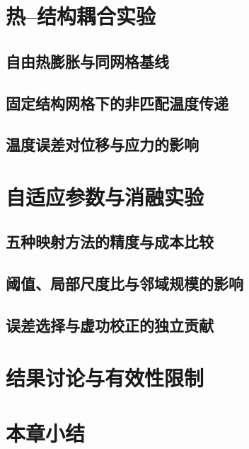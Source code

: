 \section{热--结构耦合实验}
\subsection{自由热膨胀与同网格基线}
\thesisdraftnote

\subsection{固定结构网格下的非匹配温度传递}
\thesisdraftnote

\subsection{温度误差对位移与应力的影响}
\thesisdraftnote

\section{自适应参数与消融实验}
\subsection{五种映射方法的精度与成本比较}
\thesisdraftnote

\subsection{阈值、局部尺度比与邻域规模的影响}
\thesisdraftnote

\subsection{误差选择与虚功校正的独立贡献}
\thesisdraftnote

\section{结果讨论与有效性限制}
\thesisdraftnote

\section{本章小结}
\thesisdraftnote

